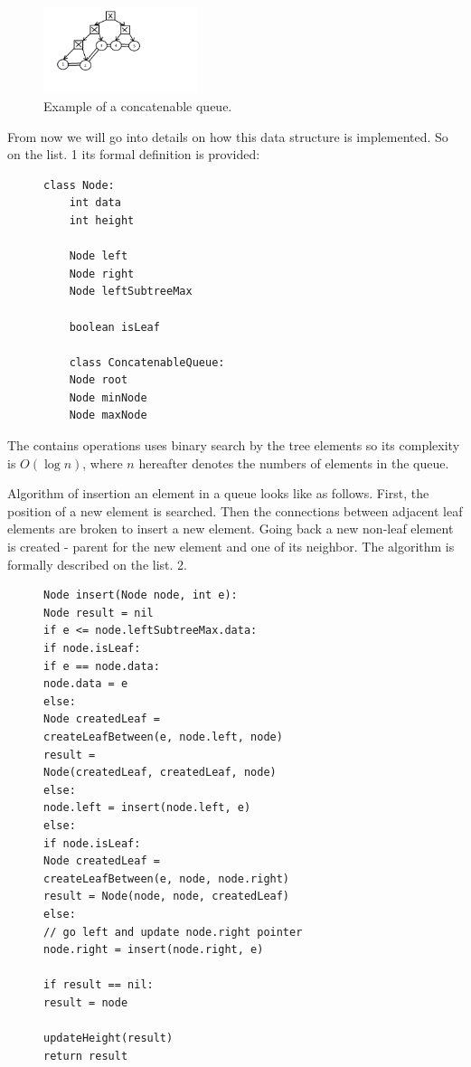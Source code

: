 \documentclass[conference]{IEEEtran}
\theoremstyle{plane}
\begin{document}
\begin{figure}[htbp]
	\centerline{\includegraphics[width=0.4\textwidth, height=0.2\textheight]{cq_example}}
	\caption{Example of a concatenable queue.}
	\label{cq_example}
\end{figure}

From now we will go into details on how this data structure is implemented. So on the list. 1 its formal definition is provided:

\begin{figure}[htbp]
	\begin{lstlisting}[caption={Structure of a concatenable queue vertex},captionpos=b]
	class Node:
	int data		
	int height
	
	Node left
	Node right
	Node leftSubtreeMax
	
	boolean isLeaf
	
	class ConcatenableQueue:
	Node root
	Node minNode
	Node maxNode
	\end{lstlisting}
\end{figure}

The contains operations uses binary search by the tree elements so its complexity is $O(\log n)$, where $n$ hereafter denotes the numbers of elements in the queue.

Algorithm of insertion an element in a queue looks like as follows. First, the position of a new element is searched. Then the connections between adjacent leaf elements are broken to insert a new element. Going back a new non-leaf element is created - parent for the new element and one of its neighbor. The algorithm is formally described on the list. 2.

\begin{figure}[htbp]
\begin{lstlisting}[caption={Queue element insertion algorithm},captionpos=b]
Node insert(Node node, int e):
Node result = nil
if e <= node.leftSubtreeMax.data: 
if node.isLeaf:
if e == node.data:
node.data = e
else:
Node createdLeaf = 
createLeafBetween(e, node.left, node)
result = 
Node(createdLeaf, createdLeaf, node)
else:
node.left = insert(node.left, e)
else:
if node.isLeaf: 
Node createdLeaf = 
createLeafBetween(e, node, node.right)
result = Node(node, node, createdLeaf)
else: 
// go left and update node.right pointer
node.right = insert(node.right, e)

if result == nil:
result = node

updateHeight(result)
return result
\end{lstlisting}
\end{figure}
	
\end{document}
